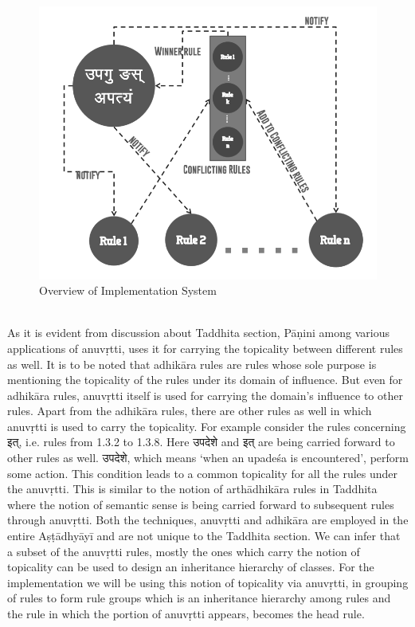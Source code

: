 \documentclass[11pt]{article}
\begin{document}
\begin{figure}[h]
    \centering
	\includegraphics[width=\textwidth]{impl}
    \caption{Overview of Implementation System}
    \label{fig:impl-fig}
\end{figure}
\\
As it is evident from discussion about Taddhita section, Pāṇini among various applications of anuvṛtti, uses it for carrying the topicality between different rules as well. It is to be noted that adhikāra rules are rules whose sole purpose is mentioning the topicality of the rules under its domain of influence. But even for adhikāra rules, anuvṛtti itself is used for carrying the domain's influence to other rules. Apart from the adhikāra rules, there are other rules as well in which anuvṛtti is used to carry the topicality. For example consider the rules concerning {\skt  इत्}, i.e. rules from 1.3.2 to 1.3.8. Here {\skt उपदेशे and इत्} are being carried forward to other rules as well. {\skt उपदेशे}, which means `when an upadeśa is encountered', perform some action. This condition leads to a common topicality for all the rules under the anuvṛtti. This is similar to the notion of arthādhikāra rules in Taddhita where the notion of semantic sense is being carried forward to subsequent rules through anuvṛtti. Both the techniques, anuvṛtti and adhikāra are employed in the entire Aṣṭādhyāyī and are not unique to the Taddhita section. We can infer that a subset of the anuvṛtti rules, mostly the ones which carry the notion of topicality can be used to design an inheritance hierarchy of classes. For the implementation we will be using this notion of topicality via anuvṛtti, in grouping of rules to form rule groups which is an inheritance hierarchy among rules and the rule in which the portion of anuvṛtti appears, becomes the head rule.
\\
\end{document}
